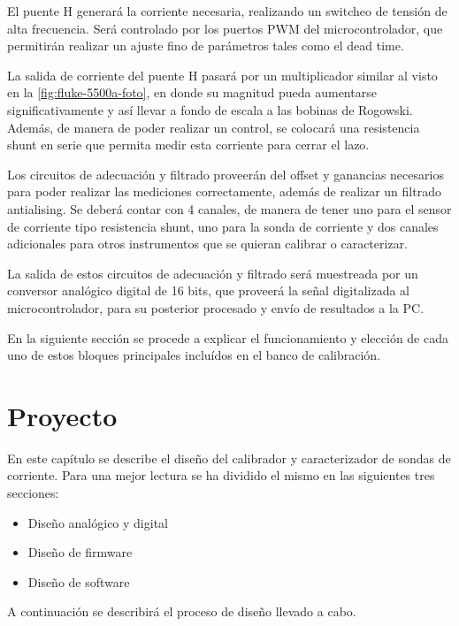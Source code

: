 \documentclass[titlepage, 12pt]{article}
\begin{document}
  El puente H generará la corriente necesaria, realizando un switcheo de tensión de alta frecuencia. Será controlado por los puertos PWM del microcontrolador, que permitirán realizar un ajuste fino de parámetros tales como el dead time.

  La salida de corriente del puente H pasará por un multiplicador similar al visto en la \autoref{fig:fluke-5500a-foto}, en donde su magnitud pueda aumentarse significativamente y así llevar a fondo de escala a las bobinas de Rogowski. Además, de manera de poder realizar un control, se colocará una resistencia shunt en serie que permita medir esta corriente para cerrar el lazo.

  Los circuitos de adecuación y filtrado proveerán del offset y ganancias necesarios para poder realizar las mediciones correctamente, además de realizar un filtrado antialising. Se deberá contar con 4 canales, de manera de tener uno para el sensor de corriente tipo resistencia shunt, uno para la sonda de corriente y dos canales adicionales para otros instrumentos que se quieran calibrar o caracterizar.

  La salida de estos circuitos de adecuación y filtrado será muestreada por un conversor analógico digital de 16 bits, que proveerá la señal digitalizada al microcontrolador, para su posterior procesado y envío de resultados a la PC.

  En la siguiente sección se procede a explicar el funcionamiento y elección de cada uno de estos bloques principales incluídos en el banco de calibración.

\section{Proyecto}
En este capítulo se describe el diseño del calibrador y caracterizador de sondas de corriente. Para una mejor lectura se ha dividido el mismo en las siguientes tres secciones:

    \begin{itemize}
        \item Diseño analógico y digital
        \item Diseño de firmware
        \item Diseño de software
    \end{itemize}

A continuación se describirá el proceso de diseño llevado a cabo.
\end{document}
